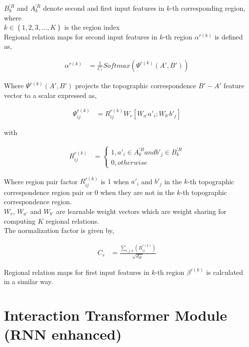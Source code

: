\documentclass{article}
\begin{document}
\noindent $B_{k}^{'R}$ and $A_{k}^{'R}$ denote second and first input features in $k$-th corresponding region, \\

where \\

\indent\indent $k \in \left\{1, 2, 3, ..., K\right\}$ is the region index \\

\noindent Regional relation maps for second input features in $k$-th region $\alpha^{r(k)}$ is defined as,

\begin{align}
\alpha^{r(k)} &= \frac{1}{C_{r}}Softmax\left(\Psi^{r(k)}(A', B')\right)
\end{align}

\noindent Where $\Psi^{r(k)}(A', B')$ projects the topographic correspondence $B'-A'$ feature vector to a scalar expressed as,

\begin{align}
\Psi_{ij}^{r(k)} &= R_{ij}^{r(k)}W_{r}[W_{a'}a'_{i}; W_{b'}b'_{j}] 
\end{align}

with

\begin{align}
R_{ij}^{r(k)} &= \begin{cases}
		1, a'_{i} \in A_{k}^{'R} and b'_{j} \in B_{k}^{'R} \\ 
		0, otherwise
	\end{cases} 
\end{align}

\noindent Where region pair factor $R_{ij}^{r(k)}$ is $1$ when $a'_{i}$ and $b'_{j}$ in the $k$-th topographic correspondence region pair or $0$ when they are not in the $k$-th topographic correspondence region. \\
\noindent $W_{r}$, $W_{a'}$ and $W_{b'}$ are learnable weight vectors which are weight sharing for computing $K$ regional relations. \\

\noindent The normalization factor is given by,

\begin{align}
C_{r} &= \frac{\sum_{i, j, k}\left(R_{ij}^{r(k)}\right)}{\sqrt{d_{B'}}}
\end{align}

\noindent Regional relation maps for first input features in $k$-th region $\beta^{r(k)}$ is calculated in a similar way.

\section{Interaction Transformer Module (RNN enhanced)}
 
\end{document}
